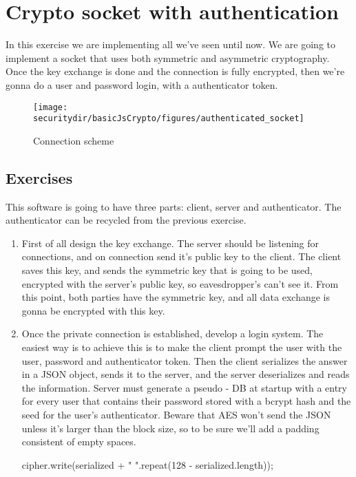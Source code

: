\section{Crypto socket with authentication}

In this exercise we are implementing all we've seen until now. We are going to implement a socket that uses both symmetric and asymmetric cryptography. Once the key exchange is done and the connection is fully encrypted, then we're gonna do a user and password login, with a authenticator token.

\begin{figure}[htb]
	\begin{centering}
		\texttt{[image: \\securitydir/basicJsCrypto/figures/authenticated\_socket]}
		\par\end{centering}
	\caption{\label{fig:authenticated_socket} Connection scheme}
\end{figure}


\subsection{Exercises}
This software is going to have three parts: client, server and authenticator. The authenticator can be recycled from the previous exercise. 
\begin{enumerate}
	\item First of all design the key exchange. The server should be listening for connections, and on connection send it's public key to the client. The client saves this key, and sends the symmetric key that is going to be used, encrypted with the server's public key, so eavesdropper's can't see it. From this point, both parties have the symmetric key, and all data exchange is gonna be encrypted with this key.
	
	\item Once the private connection is established, develop a login system. The easiest way is to achieve this is to make the client prompt the user with the user, password and authenticator token. Then the client serializes the answer in a JSON object, sends it to the server, and the server deserializes and reads the information. Server must generate a pseudo - DB at startup with a entry for every user that contains their password stored with a bcrypt hash and the seed for the user's authenticator. Beware that AES won't send the JSON unless it's larger than the block size, so to be sure we'll add a padding consistent of empty spaces.
	\begin{js}
	cipher.write(serialized + " ".repeat(128 - serialized.length));
	\end{js}
\end{enumerate}


